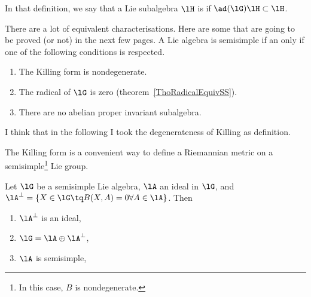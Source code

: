 In that definition, we say that a Lie subalgebra \( \lH\) is  if \( \ad(\lG)\lH\subset\lH\).

There are a lot of equivalent characterisations. Here are some that are going to be proved (or not) in the next few pages. A Lie algebra is semisimple if an only if one of the following conditions is respected.
\begin{enumerate}
    \item
        The Killing form is nondegenerate.
    \item
        The radical of \( \lG\) is zero (theorem~\ref{ThoRadicalEquivSS}).
    \item
        There are no abelian proper invariant subalgebra.
\end{enumerate}

\begin{probleme}
    I think that in the following I took the degenerateness of Killing as definition.
\end{probleme}

The Killing form is a convenient way to define a Riemannian metric on a semisimple\footnote{In this case, $B$ is nondegenerate.} Lie group.

\begin{proposition}
Let $\lG$ be a semisimple Lie algebra, $\lA$ an ideal in $\lG$, and $\lA^{\perp}=\{X\in\lG\tq B(X,A)=0\forall A\in\lA\}$.
Then
\begin{enumerate}
\item $\lA^{\perp}$ is an ideal,
\item $\lG=\lA\oplus\lA^{\perp}$,
\item $\lA$ is semisimple,
\end{enumerate}
\label{prop:a_aperp}
\end{proposition}

